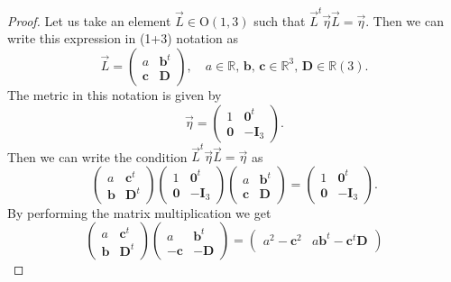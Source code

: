 \begin{proof}
    Let us take an element \(\vec{L} \in \mathrm{O}(1,3)\) such that \(\vec{L}^t \vec{\eta} \vec{L} = \vec{\eta}\). Then we can write this expression in (1+3) notation as
    \[
        \vec{L} = \begin{pmatrix}
            a          & \mathbf{b}^t \\
            \mathbf{c} & \mathbf{D}
        \end{pmatrix}, \quad a \in \mathbb{R},\, \mathbf{b},\,\mathbf{c} \in \mathbb{R}^3,\, \mathbf{D} \in \mathbb{R}(3).
    \]
    The metric in this notation is given by
    \[
        \vec{\eta} = \begin{pmatrix}
            1          & \mathbf{0}^t  \\
            \mathbf{0} & -\mathbf{I}_3
        \end{pmatrix}.
    \]
    Then we can write the condition \(\vec{L}^t \vec{\eta} \vec{L} = \vec{\eta}\) as
    \[
        \begin{pmatrix}
            a          & \mathbf{c}^t \\
            \mathbf{b} & \mathbf{D}^t
        \end{pmatrix} \begin{pmatrix}
            1          & \mathbf{0}^t  \\
            \mathbf{0} & -\mathbf{I}_3
        \end{pmatrix} \begin{pmatrix}
            a          & \mathbf{b}^t \\
            \mathbf{c} & \mathbf{D}
        \end{pmatrix} = \begin{pmatrix}
            1          & \mathbf{0}^t  \\
            \mathbf{0} & -\mathbf{I}_3
        \end{pmatrix}.
    \]
    By performing the matrix multiplication we get
    \[
        \begin{pmatrix}
            a          & \mathbf{c}^t \\
            \mathbf{b} & \mathbf{D}^t
        \end{pmatrix} \begin{pmatrix}
            a           & \mathbf{b}^t \\
            -\mathbf{c} & -\mathbf{D}
        \end{pmatrix} = \begin{pmatrix}
            a^2 - \mathbf{c}^2                     & a \mathbf{b}^t - \mathbf{c}^t \mathbf{D}                \\

\end{pmatrix}\]
\end{proof}
